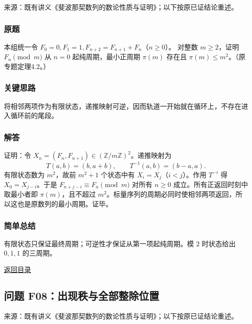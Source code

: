 \documentclass[11pt,a4paper]{article}
\begin{document}
来源：既有讲义《斐波那契数列的数论性质与证明》；以下按原已证结论重述。

\subsubsection{原题}\label{ux539fux9898-39}

本组统一令 \(F_0=0,F_1=1,F_{n+2}=F_{n+1}+F_n\)（\(n\ge0\)）。 对整数
\(m\ge2\)，证明 \(F_n\pmod m\) 从 \(n=0\) 起纯周期，最小正周期
\(\pi(m)\) 存在且 \(\pi(m)\le m^2\)。（原专题定理4.2。）

\subsubsection{关键思路}\label{ux5173ux952eux601dux8def-39}

将相邻两项作为有限状态，递推映射可逆，因而轨道一开始就在循环上，不存在进入循环前的尾段。

\subsubsection{解答}\label{ux89e3ux7b54-39}

证明：令 \(X_n=(F_n,F_{n+1})\in(\mathbb Z/m\mathbb Z)^2\)。递推映射为
\[T(a,b)=(b,a+b),\qquad T^{-1}(a,b)=(b-a,a).\] 有限状态数为
\(m^2\)，故前 \(m^2+1\) 个状态中有 \(X_i=X_j\)（\(i<j\)）。作用
\(T^{-i}\) 得 \(X_0=X_{j-i}\)。于是 \(F_{n+j-i}\equiv F_n\pmod m\)
对所有 \(n\ge0\) 成立。所有正返回时刻中取最小者即 \(\pi(m)\)，且不超过
\(m^2\)。标量序列的周期必同时使相邻两项返回，所以这也是原数列的最小周期。证毕。

\subsubsection{简单总结}\label{ux7b80ux5355ux603bux7ed3-39}

有限状态只保证最终周期；可逆性才保证从第一项起纯周期。模 \(2\)
时状态给出 \(0,1,1\) 的三周期。

\noindent\hyperref[contents]{返回目录}

\subsection{问题
F08：出现秩与全部整除位置}\label{ux95eeux9898-f08ux51faux73b0ux79e9ux4e0eux5168ux90e8ux6574ux9664ux4f4dux7f6e}

来源：既有讲义《斐波那契数列的数论性质与证明》；以下按原已证结论重述。
\end{document}
